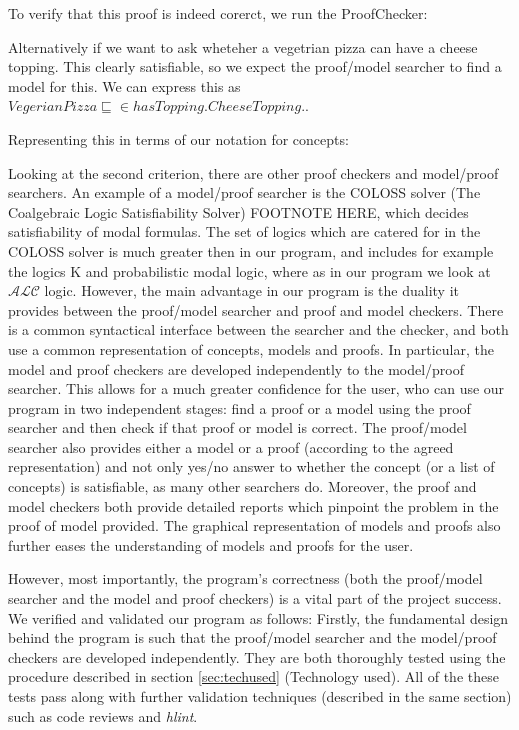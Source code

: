 To verify that this proof is indeed corerct, we run the ProofChecker:

Alternatively if we want to ask wheteher a vegetrian pizza can have a cheese topping. This clearly satisfiable, so we expect the proof/model searcher to find a model for this. We can express this as $VegerianPizza \sqsubseteq \in hasTopping.CheeseTopping.$. 

Representing this in terms of our notation for concepts:

Looking at the second criterion, there are other proof checkers and model/proof searchers. An example of a model/proof searcher is the COLOSS solver (The Coalgebraic Logic Satisfiability Solver) FOOTNOTE HERE, which decides satisfiability of modal formulas. The set of logics which are catered for in the COLOSS solver is much greater then in our program, and includes for example the logics K and probabilistic modal logic, where as in our program we look at $\mathcal{ALC}$ logic. However, the main advantage in our program is the duality it provides between the proof/model searcher and proof and model checkers. There is a common syntactical interface between the searcher and the checker, and both use a common representation of concepts, models and proofs. In particular, the model and proof checkers are developed independently to the model/proof searcher. This allows for a much greater confidence for the user, who can use our program in two independent stages: find a proof or a model using the proof searcher and then check if that proof or model is correct. The proof/model searcher also provides either a model or a proof (according to the agreed representation) and not only yes/no answer to whether the concept (or a list of concepts) is satisfiable, as many other searchers do. Moreover, the proof and model checkers both provide detailed reports which pinpoint the problem in the proof of model provided. The graphical representation of models and proofs also further eases the understanding of models and proofs for the user.

However, most importantly, the program's correctness (both the proof/model searcher and the model and proof checkers) is a vital part of the project success. We verified and validated our program as follows: Firstly, the fundamental design behind the program is such that the proof/model searcher and the model/proof checkers are developed independently. They are both thoroughly tested using the procedure described in section \ref{sec:techused} (Technology used). All of the these tests pass along with further validation techniques (described in the same section) such as code reviews and \emph{hlint}.

